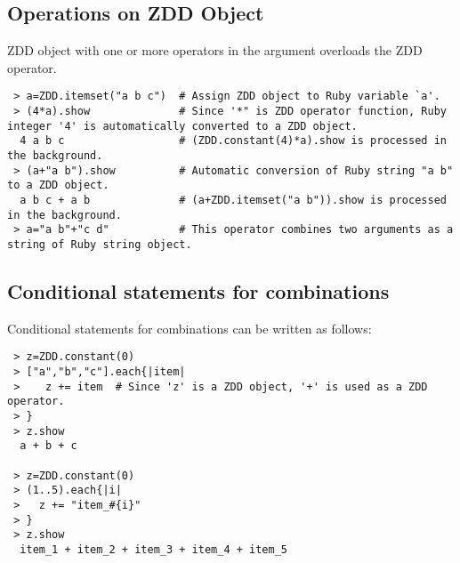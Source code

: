  \subsection{Operations on ZDD Object}
 
 ZDD object with one or more operators in the argument overloads the ZDD operator. 
 \begin{verbatim}
 > a=ZDD.itemset("a b c")  # Assign ZDD object to Ruby variable `a'.
 > (4*a).show              # Since '*" is ZDD operator function, Ruby integer '4' is automatically converted to a ZDD object. 
  4 a b c                  # (ZDD.constant(4)*a).show is processed in the background.
 > (a+"a b").show          # Automatic conversion of Ruby string "a b" to a ZDD object. 
  a b c + a b              # (a+ZDD.itemset("a b")).show is processed in the background.
 > a="a b"+"c d"           # This operator combines two arguments as a string of Ruby string object. 
 \end{verbatim}
 
\subsection{Conditional statements for combinations}

Conditional statements for combinations can be written as follows: 
 \begin{verbatim}
 > z=ZDD.constant(0)
 > ["a","b","c"].each{|item|
 >    z += item  # Since 'z' is a ZDD object, '+' is used as a ZDD operator.
 > }
 > z.show
  a + b + c

 > z=ZDD.constant(0)
 > (1..5).each{|i|
 >   z += "item_#{i}"
 > }
 > z.show
  item_1 + item_2 + item_3 + item_4 + item_5
 \end{verbatim}




